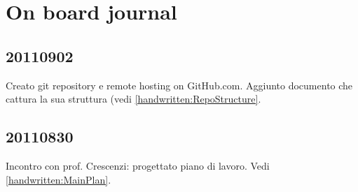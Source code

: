 \section{On board journal}

\subsection{20110902}
Creato git repository e remote hosting on GitHub.com.
Aggiunto documento che cattura la sua struttura (vedi 
\ref{handwritten:RepoStructure}.

\subsection{20110830}
Incontro con prof. Crescenzi: progettato piano di lavoro. Vedi 
\ref{handwritten:MainPlan}.
